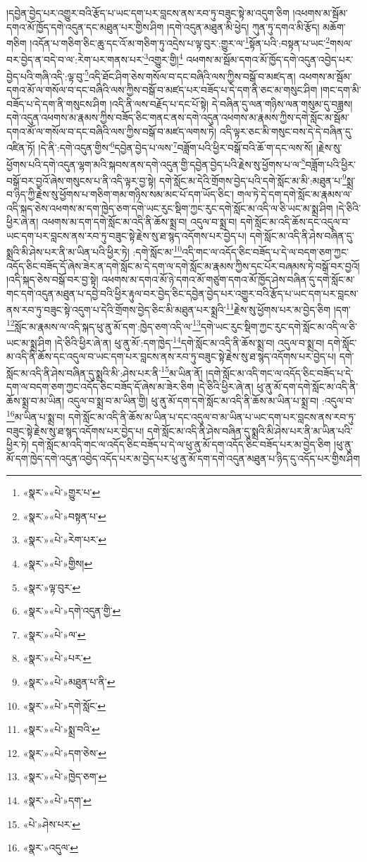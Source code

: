 །དབྱེན་བྱེད་པར་འགྱུར་བའི་རྩོད་པ་ཡང་དག་པར་བླངས་ནས་རབ་ཏུ་བཟུང་སྟེ་མ་འདུག་ཅིག །འཕགས་མ་སྦོམ་དགའ་མོ་ཁྱོད་དགེ་འདུན་དང་མཐུན་པར་གྱིས་ཤིག །དགེ་འདུན་མཐུན་མི་ཕྱེད། ཀུན་ཏུ་དགའ་མི་རྩོད། མཆོག་གཅིག །འདོན་པ་གཅིག་ཅིང་ཆུ་དང་འོ་མ་གཅིག་ཏུ་འདྲེས་པ་ལྟ་བུར་:གྱུར་ལ་\footnote{«སྣར་»«པེ་»གྱུར་པ་}སྟོན་པའི་:བསྟན་པ་ཡང་\footnote{«སྣར་»«པེ་»བསྟན་པ་}གསལ་བར་བྱེད་ན་བདེ་བ་ལ་:རེག་པར་གནས་པར་\footnote{«སྣར་»«པེ་»རེག་པར་}འགྱུར་གྱི།\footnote{«སྣར་»«པེ་»གྱིས།} འཕགས་མ་སྦོམ་དགའ་མོ་ཁྱོད་དགེ་འདུན་འབྱེད་པར་བྱེད་པའི་གཞི་འདི་:ལྟ་བུ་\footnote{«སྣར་»ལྟ་བུར་}འདི་ཐོང་ཤིག་ཅེས་གསོལ་བ་དང་བཞིའི་ལས་ཀྱིས་བསྒོ་བ་མཛད་ན། འཕགས་མ་སྦོམ་དགའ་མོ་ལ་གསོལ་བ་དང་བཞིའི་ལས་ཀྱིས་བསྒོ་བ་མཛད་པར་བཟོད་པ་དེ་དག་ནི་ཅང་མ་གསུང་ཤིག །གང་དག་མི་བཟོད་པ་དེ་དག་ནི་གསུངས་ཤིག །འདི་ནི་ལས་བརྗོད་པ་དང་པོ་སྟེ། དེ་བཞིན་དུ་ལན་གཉིས་ལན་གསུམ་དུ་བཟླས། དགེ་འདུན་འཕགས་མ་རྣམས་ཀྱིས་བཟོད་ཅིང་གནང་ནས་དགེ་འདུན་འཕགས་མ་རྣམས་ཀྱིས་དགེ་སློང་མ་སྦོམ་དགའ་མོ་ལ་གསོལ་བ་དང་བཞིའི་ལས་ཀྱིས་བསྒོ་བ་མཛད་ལགས་ཏེ། འདི་ལྟར་ཅང་མི་གསུང་བས་དེ་དེ་བཞིན་དུ་འཛིན་ཏོ། །དེ་ནི་:དགེ་འདུན་གྱིས་\footnote{«སྣར་»«པེ་»དགེ་འདུན་གྱི་}དབྱེན་བྱེད་པ་ལས་\footnote{«སྣར་»«པེ་»ལ་}བཟློག་པའི་ཕྱིར་བསྒོ་བའི་ཆོ་ག་དང་ལས་སོ། །རྗེས་སུ་ཕྱོགས་པའི་དགེ་འདུན་ལྷག་མའི་སྐབས་ནས་དགེ་འདུན་གྱི་དབྱེན་བྱེད་པའི་རྗེས་སུ་ཕྱོགས་པ་ལ་\footnote{«སྣར་»«པེ་»པར་}བཟློག་པའི་ཕྱིར་བསྒོ་བར་བྱའོ་ཞེས་གསུངས་པ་ནི་འདི་ལྟར་བྱ་སྟེ། དགེ་སློང་མ་དེའི་གྲོགས་བྱེད་པའི་དགེ་སློང་མ་མི་:མཐུན་པ་\footnote{«སྣར་»«པེ་»མཐུན་པ་ནི་}སྨྲ་བ་ཉིད་ཀྱི་རྗེས་སུ་ཕྱོགས་པ་གཅིག་གམ་གཉིས་སམ་མང་པོ་དག་ཡོད་ཅིང་། གལ་ཏེ་དེ་དག་དགེ་སློང་མ་རྣམས་ལ་འདི་སྐད་ཅེས་འཕགས་མ་དག་ཁྱེད་ཅག་དགེ་ཡང་རུང་སྡིག་ཀྱང་རུང་དགེ་སློང་མ་འདི་ལ་ཅི་ཡང་མ་སྨྲ་ཤིག །དེ་ཅིའི་ཕྱིར་ཞེ་ན། འཕགས་མ་དག་དགེ་སློང་མ་འདི་ནི་ཆོས་སྨྲ་བ། འདུལ་བ་སྨྲ་བ། དགེ་སློང་མ་འདི་ཆོས་དང་འདུལ་བ་ཡང་དག་པར་བླངས་ནས་རབ་ཏུ་བཟུང་སྟེ་རྗེས་སུ་ཐ་སྙད་འདོགས་པར་བྱེད་པ། དགེ་སློང་མ་འདི་ནི་ཤེས་བཞིན་དུ་སྨྲའི་མི་ཤེས་པར་ནི་མ་ཡིན་པའི་ཕྱིར་ཏེ། :དགེ་སློང་མ་\footnote{«སྣར་»«པེ་»དགེ་སློང་}འདི་གང་ལ་འདོད་ཅིང་བཟོད་པ་དེ་ལ་བདག་ཅག་ཀྱང་འདོད་ཅིང་བཟོད་དོ་ཞེས་ཟེར་ན་དགེ་སློང་མ་དེ་དག་ལ་དགེ་སློང་མ་རྣམས་ཀྱིས་དང་པོར་བཞམས་ཏེ་བསྒོ་བར་བྱའོ། །འདི་སྐད་ཅེས་བསྒོ་བར་བྱ་སྟེ། འཕགས་མ་དགའ་མོ་ཉེ་དགའ་མོ་གཙུག་དགའ་མོ་ཁྱོད་ཤེས་བཞིན་དུ་དགེ་སློང་མ་གང་དགེ་འདུན་མཐུན་པ་དབྱེ་བའི་ཕྱིར་རྟུལ་བར་བྱེད་ཅིང་དབྱེན་བྱེད་པར་འགྱུར་བའི་རྩོད་པ་ཡང་དག་པར་བླངས་ནས་རབ་ཏུ་བཟུང་སྟེ་འདུག་པ་དེའི་གྲོགས་བྱེད་ཅིང་མི་མཐུན་པར་སྨྲའི་\footnote{«སྣར་»«པེ་»སྨྲ་བའི་}རྗེས་སུ་ཕྱོགས་པར་མ་བྱེད་ཅིག །དག་\footnote{«སྣར་»«པེ་»དག་ཅེས་}སློང་མ་རྣམས་ལ་འདི་སྐད་ཕུ་ནུ་མོ་དག་:ཁྱེད་ཅག་འདི་ལ་\footnote{«སྣར་»«པེ་»ཁྱེད་ཅག་}དགེ་ཡང་རུང་སྡིག་ཀྱང་རུང་དགེ་སློང་མ་འདི་ལ་ཅི་ཡང་མ་སྨྲ་ཤིག །དེ་ཅིའི་ཕྱིར་ཞེ་ན། ཕུ་ནུ་མོ་:དག་ཁྱེད་\footnote{«སྣར་»«པེ་»དག་}དགེ་སློང་མ་འདི་ནི་ཆོས་སྨྲ་བ། འདུལ་བ་སྨྲ་བ། དགེ་སློང་མ་འདི་ནི་ཆོས་དང་འདུལ་བ་ཡང་དག་པར་བླངས་ནས་རབ་ཏུ་བཟུང་སྟེ་རྗེས་སུ་ཐ་སྙད་འདོགས་པར་བྱེད་པ། དགེ་སློང་མ་འདི་ནི་ཤེས་བཞིན་དུ་སྨྲའི་མི་:ཤེས་པར་ནི་\footnote{«པེ་»ཤེས་པར་}མ་ཡིན་ནོ། །དགེ་སློང་མ་འདི་གང་ལ་འདོད་ཅིང་བཟོད་པ་དེ་དག་ལ་བདག་ཅག་ཀྱང་འདོད་ཅིང་བཟོད་དོ་ཞེས་མ་ཟེར་ཅིག །དེ་ཅིའི་ཕྱིར་ཞེ་ན། ཕུ་ནུ་མོ་དག་དགེ་སློང་མ་འདི་ནི་ཆོས་སྨྲ་བ་མ་ཡིན། འདུལ་བ་སྨྲ་བ་མ་ཡིན་གྱི། ཕུ་ནུ་མོ་དག་དགེ་སློང་མ་འདི་ནི་ཆོས་མ་ཡིན་པ་སྨྲ་བ། :འདུལ་བ་\footnote{«སྣར་»འདུལ་}མ་ཡིན་པ་སྨྲ་བ། དགེ་སློང་མ་འདི་ནི་ཆོས་མ་ཡིན་པ་དང་འདུལ་བ་མ་ཡིན་པ་ཡང་དག་པར་བླངས་ནས་རབ་ཏུ་བཟུང་སྟེ་རྗེས་སུ་ཐ་སྙད་འདོགས་པར་བྱེད་པ། དགེ་སློང་མ་འདི་ནི་ཤེས་བཞིན་དུ་སྨྲའི་མི་ཤེས་པར་ནི་མ་ཡིན་པའི་ཕྱིར་ཏེ། དགེ་སློང་མ་འདི་གང་ལ་འདོད་ཅིང་བཟོད་པ་དེ་ལ་ཕུ་ནུ་མོ་དག་འདོད་ཅིང་བཟོད་པར་མ་བྱེད་ཅིག །ཕུ་ནུ་མོ་དག་ཁྱེད་དགེ་འདུན་འབྱེད་འདོད་པར་མ་བྱེད་པར་ཕུ་ནུ་མོ་དག་དགེ་འདུན་མཐུན་པ་ཉིད་དུ་འདོད་པར་གྱིས་ཤིག 